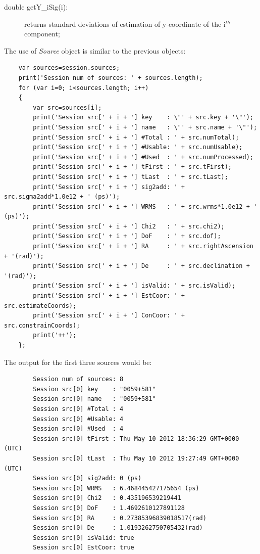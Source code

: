 \documentclass [10pt,letterpaper]{report}
\begin{document}
{{\begin{description}
\item[double getY\_iSig(i):] returns standard deviations of estimation of y-coordinate of the i$^{th}$ component;
\end{description}
\noindent
The use of {\sl Source} object is similar to the previous objects:
{\small\begin{verbatim}
    var sources=session.sources;
    print('Session num of sources: ' + sources.length);
    for (var i=0; i<sources.length; i++)
    {
        var src=sources[i];
        print('Session src[' + i + '] key    : \"' + src.key + '\"');
        print('Session src[' + i + '] name   : \"' + src.name + '\"');
        print('Session src[' + i + '] #Total : ' + src.numTotal);
        print('Session src[' + i + '] #Usable: ' + src.numUsable);
        print('Session src[' + i + '] #Used  : ' + src.numProcessed);
        print('Session src[' + i + '] tFirst : ' + src.tFirst);
        print('Session src[' + i + '] tLast  : ' + src.tLast);
        print('Session src[' + i + '] sig2add: ' + src.sigma2add*1.0e12 + ' (ps)');
        print('Session src[' + i + '] WRMS   : ' + src.wrms*1.0e12 + ' (ps)');
        print('Session src[' + i + '] Chi2   : ' + src.chi2);
        print('Session src[' + i + '] DoF    : ' + src.dof);
        print('Session src[' + i + '] RA     : ' + src.rightAscension + '(rad)');
        print('Session src[' + i + '] De     : ' + src.declination + '(rad)');
        print('Session src[' + i + '] isValid: ' + src.isValid);
        print('Session src[' + i + '] EstCoor: ' + src.estimateCoords);
        print('Session src[' + i + '] ConCoor: ' + src.constrainCoords);
        print('++');
    };
\end{verbatim}}
\noindent
The output for the first three sources would be:
{\small\begin{verbatim}
        Session num of sources: 8
        Session src[0] key    : "0059+581"
        Session src[0] name   : "0059+581"
        Session src[0] #Total : 4
        Session src[0] #Usable: 4
        Session src[0] #Used  : 4
        Session src[0] tFirst : Thu May 10 2012 18:36:29 GMT+0000 (UTC)
        Session src[0] tLast  : Thu May 10 2012 19:27:49 GMT+0000 (UTC)
        Session src[0] sig2add: 0 (ps)
        Session src[0] WRMS   : 6.468445427175654 (ps)
        Session src[0] Chi2   : 0.435196539219441
        Session src[0] DoF    : 1.4692610127891128
        Session src[0] RA     : 0.27385396839018517(rad)
        Session src[0] De     : 1.0193262750705432(rad)
        Session src[0] isValid: true
        Session src[0] EstCoor: true

\end{verbatim}}}}
\end{document}
